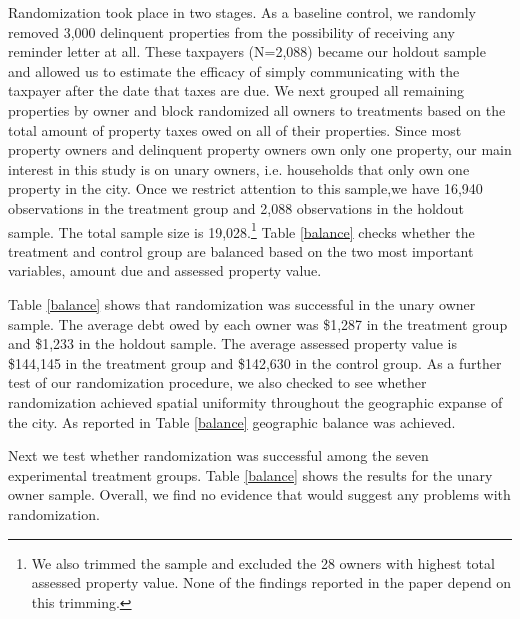 \documentclass[12pt]{article}
\begin{document}
Randomization took place in two stages.  As a baseline control, we
randomly removed 3,000 delinquent properties from the possibility of
receiving any reminder letter at all.  These taxpayers (N=2,088)
became our holdout sample and allowed us to estimate the efficacy of
simply communicating with the taxpayer after the date that taxes are
due. We next grouped all remaining properties by owner and block
randomized all owners to treatments based on the total amount of
property taxes owed on all of their properties. Since most property
owners and delinquent property owners own only one property, our main
interest in this study is on unary owners, i.e. households that only
own one property in the city. Once we restrict attention to this
sample,we have 16,940 observations in the treatment group and 2,088
observations in the holdout sample.  The total sample size is
19,028.\footnote{We also trimmed the sample and excluded the 28 owners
  with highest total assessed property value. None of the findings
  reported in the paper depend on this trimming.}  Table \ref{balance}
checks whether the treatment and control group are balanced based on
the two most important variables, amount due and assessed property
value.

Table \ref{balance} shows that randomization was successful in the
unary owner sample.  The average debt owed by each owner was \$1,287
in the treatment group and \$1,233 in the holdout sample. The average
assessed property value is \$144,145 in the treatment group and
\$142,630 in the control group. As a further test of our randomization
procedure, we also checked to see whether randomization achieved
spatial uniformity throughout the geographic expanse of the city. As
reported in Table \ref{balance} geographic balance was achieved.

Next we test whether randomization was successful among the seven
experimental treatment groups. Table \ref{balance} shows the results
for the unary owner sample. Overall, we find no evidence that would
suggest any problems with randomization.
\end{document}
